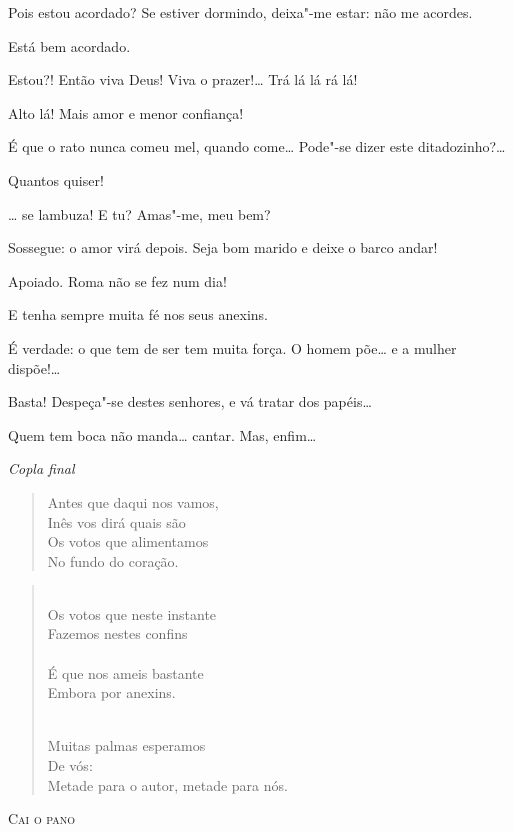 \begin{linenumbers}
  Pois estou acordado? Se estiver dormindo, deixa"-me estar: não me
acordes.

  Está bem acordado.

  Estou?!  Então viva Deus! Viva o
prazer!\ldots{} Trá lá lá rá lá! 

   Alto lá! Mais amor e menor confiança!

  É que o rato nunca comeu mel, quando come\ldots{} 
Pode"-se dizer este ditadozinho?\ldots{}

  Quantos quiser!

   \ldots{} se lambuza!   E tu? Amas"-me, meu bem?

  Sossegue: o amor virá depois. Seja bom marido e deixe o
barco andar!

  Apoiado. Roma não se fez num dia!

  E tenha sempre muita fé nos seus anexins.

  É verdade: o que tem de ser tem muita força. O homem põe\ldots{}
e a mulher dispõe!\ldots{}

  Basta! Despeça"-se destes senhores, e vá tratar dos papéis\ldots{}

  Quem tem boca não manda\ldots{} cantar. Mas, enfim\ldots{} 
\smallskip


{\smallskip\raggedleft\itshape Copla final\par}
\begin{verse} 
Antes que daqui nos vamos,\\
Inês vos dirá quais são\\
Os votos que alimentamos\\
No fundo do coração.  
\end{verse}

\begin{verse}
\\
Os votos que neste instante\\
Fazemos nestes confins\\
\\
É que nos ameis bastante\\
Embora por anexins.

\\
Muitas palmas esperamos\\
\quad De vós:\\
Metade para o autor, metade para nós.
\end{verse}

\vspace{1cm}

\begin{center}
\textsc{Cai o pano}
\end{center}

\end{linenumbers}

